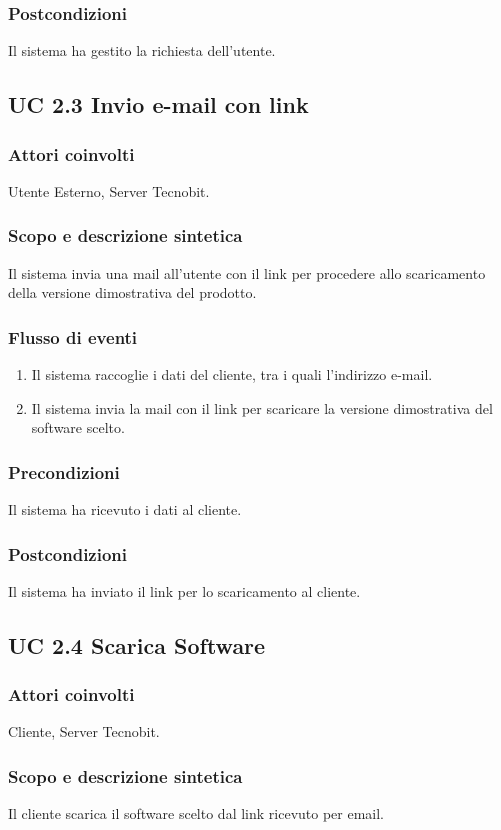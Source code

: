 \subsubsection*{Postcondizioni} Il sistema ha gestito la richiesta dell'utente.

\subsection*{UC 2.3 Invio e-mail con link}
\subsubsection*{Attori coinvolti} Utente Esterno, Server Tecnobit.
\subsubsection*{Scopo e descrizione sintetica}
Il sistema invia una mail all'utente con il link per procedere allo scaricamento della versione dimostrativa del prodotto.
\subsubsection*{Flusso di eventi}
\begin{enumerate}
\item Il sistema raccoglie i dati del cliente, tra i quali l'indirizzo e-mail.
\item Il sistema invia la mail con il link per scaricare la versione dimostrativa del software scelto.
\end{enumerate}
\subsubsection*{Precondizioni} Il sistema ha ricevuto i dati al cliente.
\subsubsection*{Postcondizioni} Il sistema ha inviato il link per lo scaricamento al cliente.

\subsection*{UC 2.4 Scarica Software}
\subsubsection*{Attori coinvolti} Cliente, Server Tecnobit.
\subsubsection*{Scopo e descrizione sintetica}
Il cliente scarica il software scelto dal link ricevuto per email.
